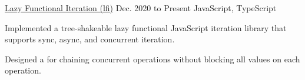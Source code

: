 
\begin{cventry}
    {\href{https://github.com/TomerAberbach/lfi}{Lazy Functional Iteration (lfi)}}{}
    {Dec. 2020 to Present}
    {JavaScript, TypeScript}
    \begin{cvitems}
        \item Implemented a tree-shakeable lazy functional JavaScript iteration library that supports sync, async, and concurrent iteration.
        \item Designed a  for chaining concurrent operations without blocking all values on each operation.
    \end{cvitems}
\end{cventry}
